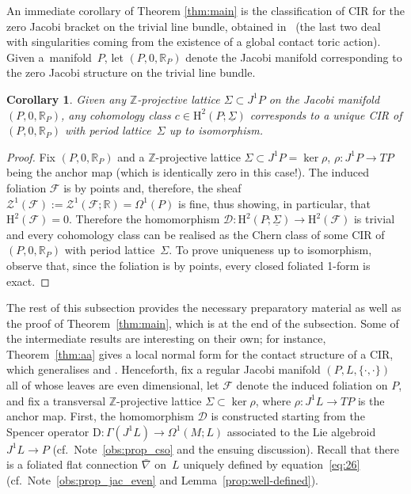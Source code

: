 \documentclass[pdftex]{sigma}
\numberwithin{equation}{section}
\newtheorem{Corollary}[Theorem]{Corollary}
\newcommand{\JM}{(P,L,\{\cdot,\cdot\})} %
\newcommand{\HH}{\mathrm{H}}
\newcommand{\RR}{\mathbb{R}}
\newcommand{\ZZ}{\mathbb{Z}}
\begin{document}
An immediate corollary of Theorem \ref{thm:main} is the classif\/ication of CIR for the zero Jacobi bracket on the trivial line bundle, obtained in~\cite{Banyaga,lerman_contact_toric,wolbert} (the last two deal with singularities coming from the existence of a global contact toric action). Given a~manifold~$P$, let $(P,0,\RR_{P})$ denote the Jacobi manifold corresponding to the zero Jacobi structure on the trivial line bundle.

\begin{Corollary}\label{cor:zero}
 Given any $\ZZ$-projective lattice $\Sigma \subset J^1P$ on the Jacobi manifold $(P,0,\RR_P)$, any cohomology class $c \in \HH^2(P;\underline{\Sigma})$ corresponds to a unique CIR of $(P,0,\RR_{P})$ with period lat\-ti\-ce~$\Sigma$ up to isomorphism.
\end{Corollary}

\begin{proof} Fix $(P,0,\RR_{P})$ and a $\ZZ$-projective lattice $\Sigma \subset J^1 P = \ker \rho$, $\rho \colon J^1 P \to TP$ being the anchor map (which is identically zero in this case!). The induced foliation $\mathcal{F}$ is by points and, therefore, the sheaf $\mathcal{Z}^1(\mathcal{F}):= \mathcal{Z}^1(\mathcal{F};\RR) = \Omega^1(P)$ is f\/ine, thus showing, in particular, that $\HH^2(\mathcal{F}) = 0$. Therefore the homomorphism $\mathcal{D} \colon \HH^2(P;\underline{\Sigma}) \to \HH^2(\mathcal{F})$ is trivial and every cohomology class can be realised as the Chern class of some CIR of~$(P,0,\RR_{P})$ with period lattice~$\Sigma$. To prove uniqueness up to isomorphism, observe that, since the foliation is by points, every closed foliated 1-form is exact.
\end{proof}

The rest of this subsection provides the necessary preparatory material as well as the proof of Theorem~\ref{thm:main}, which is at the end of the subsection. Some of the intermediate results are interesting on their own; for instance, Theorem~\ref{thm:aa} gives a local normal form for the contact structure of a CIR, which generalises \cite[Theorem~1]{Banyaga} and \cite[Theorems~4 and~5]{jovanovic}. Henceforth, f\/ix a regular Jacobi manifold $\JM$ all of whose leaves are even dimensional, let $\mathcal{F}$ denote the induced foliation on $P$, and f\/ix a transversal $\ZZ$-projective lattice
$\Sigma \subset \ker \rho$, where $\rho \colon J^1 L \to TP$ is the anchor map. First, the homomorphism $\mathcal{D}$ is constructed starting from the Spencer operator $\mathrm{D} \colon \Gamma(J^1L) \to \Omega^1(M;L)$ associated to the Lie algebroid $J^1L \to P$ (cf.\ Note~\ref{obs:prop_cso} and the ensuing discussion). Recall that there is a foliated f\/lat connection $\bar\nabla$ on~$L$ uniquely def\/ined by equation~\eqref{eq:26} (cf.\ Note~\ref{obs:prop_jac_even} and Lemma~\ref{prop:well-defined}).
\end{document}
